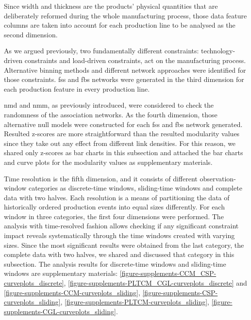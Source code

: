 Since width and thickness are the products' physical quantities that are deliberately reformed during the whole manufacturing process, those data feature columns are taken into account for each production line to be analysed as the second dimension. 

As we argued previously, two fundamentally different constraints: technology-driven constraints and load-driven constraints, act on the manufacturing process. Alternative binning methods and different network approaches were identified for those constraints. \acs{fss} and \acs{fbs} networks were generated in the third dimension for each production feature in every production line.

\acs{nmd} and \acs{nmm}, as previously introduced, were considered to check the randomness of the association networks. As the fourth dimension, those alternative null models were constructed for each \acs{fss} and \acs{fbs} network generated. Resulted z-scores are more straightforward than the resulted modularity values since they take out any effect from different link densities. For this reason, we shared only z-scores as bar charts in this subsection and attached the bar charts and curve plots for the modularity values as supplementary materials.

Time resolution is the fifth dimension, and it consists of different observation-window categories as discrete-time windows, sliding-time windows and complete data with two halves. Each resolution is a means of partitioning the data of historically ordered production events into equal sizes differently. For each window in three categories, the first four dimensions were performed. The analysis with time-resolved fashion allows checking if any significant constraint impact reveals systematically through the time windows created with varying sizes. Since the most significant results were obtained from the last category, the complete data with two halves, we shared and discussed that category in this subsection. The analysis results for discrete-time windows and sliding-time windows are supplementary materials: \ref{figure-supplements-CCM_CSP-curveplots_discrete}, \ref{figure-supplements-PLTCM_CGL-curveplots_discrete} and \ref{figure-supplements-CCM-curveplots_sliding}, \ref{figure-supplements-CSP-curveplots_sliding}, \ref{figure-supplements-PLTCM-curveplots_sliding}, \ref{figure-supplements-CGL-curveplots_sliding}.


